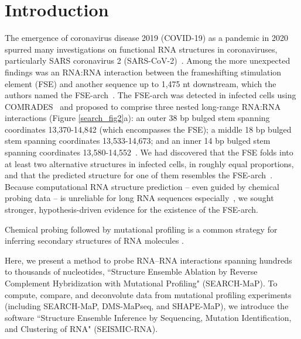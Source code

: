 \documentclass[main.tex]{subfiles}
\begin{document}
\section{Introduction}
\label{intro}

The emergence of coronavirus disease 2019 (COVID-19) as a pandemic in 2020 spurred many investigations on functional RNA structures in coronaviruses, particularly SARS coronavirus 2 (SARS-CoV-2)~\cite{Rangan2020,Manfredonia2020,Ziv2020,LSun2021,YanZhang2021,Huston2021,Rangan2021,Morandi2021,Yang2021,Lan2022}. Among the more unexpected findings was an RNA:RNA interaction between the frameshifting stimulation element (FSE) and another sequence up to 1,475 nt downstream, which the authors named the FSE-arch~\cite{Ziv2020}. The FSE-arch was detected in infected cells using COMRADES~\cite{Ziv2018} and proposed to comprise three nested long-range RNA:RNA interactions (Figure \ref{search_fig2}a): an outer 38 bp bulged stem spanning coordinates 13,370-14,842 (which encompasses the FSE); a middle 18 bp bulged stem spanning coordinates 13,533-14,673; and an inner 14 bp bulged stem spanning coordinates 13,580-14,552~\cite{Ziv2020}. We had discovered that the FSE folds into at least two alternative structures in infected cells, in roughly equal proportions, and that the predicted structure for one of them resembles the FSE-arch~\cite{Lan2022}. Because computational RNA structure prediction -- even guided by chemical probing data -- is unreliable for long RNA sequences especially~\cite{Aviran2022}, we sought stronger, hypothesis-driven evidence for the existence of the FSE-arch.


Chemical probing followed by mutational profiling is a common strategy for inferring secondary structures of RNA molecules \cite{Zubradt2016, Siegfried2014}.




Here, we present a method to probe RNA--RNA interactions spanning hundreds to thousands of nucleotides, ``Structure Ensemble Ablation by Reverse Complement Hybridization with Mutational Profiling" (SEARCH-MaP).
To compute, compare, and deconvolute data from mutational profiling experiments (including SEARCH-MaP, DMS-MaPseq, and SHAPE-MaP), we introduce the software ``Structure Ensemble Inference by Sequencing, Mutation Identification, and Clustering of RNA" (SEISMIC-RNA).
\end{document}
